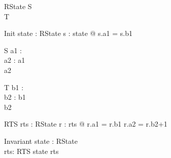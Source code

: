 \begin{schema}{RState}
S\\
T
\end{schema}

\begin{schema}{Init}
state : \power RState
\where
\forall s : state @ s.a1 = s.b1\\
\end{schema}

\begin{schema}{S}
a1 : \nat\\
a2 : \nat
\where
a1 \\
a2 
\end{schema}

\begin{schema}{T}
b1 : \nat\\
b2 : \nat
\where
b1 \\
b2 
\end{schema}

\begin{schema}{RTS}
rts : \power RState
\where
\forall r : rts @
r.a1 = r.b1 \land r.a2 = r.b2+1
\end{schema}

\begin{schema}{Invariant}
state : \power RState\\
rts: RTS
\where
state \subseteq rts
\end{schema}
